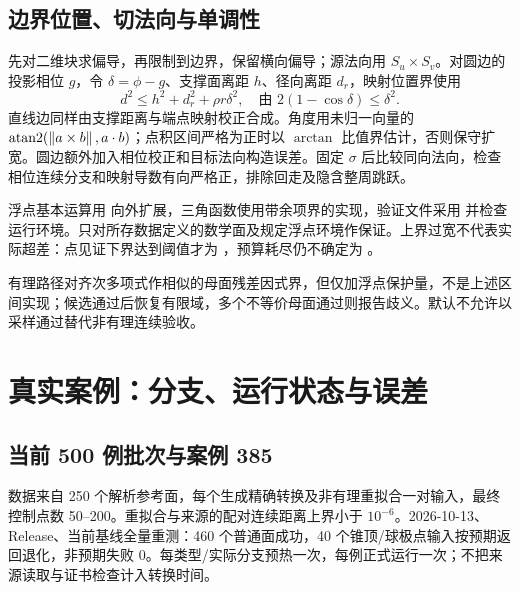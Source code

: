 \subsection{边界位置、切法向与单调性}
先对二维块求偏导，再限制到边界，保留横向偏导；源法向用 $S_u\times S_v$。对圆边的投影相位 $g$，令 $\delta=\phi-g$、支撑面离距 $h$、径向离距 $d_r$，映射位置界使用
\begin{equation}
 d^2\le h^2+d_r^2+\rho r\delta^2,
 \quad\text{由 }2(1-\cos\delta)\le\delta^2.
\end{equation}
直线边同样由支撑距离与端点映射校正合成。角度用未归一向量的 $\operatorname{atan2}(\left\lVert a\times b\right\rVert,a\cdot b)$；点积区间严格为正时以 $\arctan$ 比值界估计，否则保守扩宽。圆边额外加入相位校正和目标法向构造误差。固定 $\sigma$ 后比较同向法向，检查相位连续分支和映射导数有向严格正，排除回走及隐含整周跳跃。

\begin{center}\end{center}
浮点基本运算用  向外扩展，三角函数使用带余项界的实现，验证文件采用  并检查运行环境。只对所存数据定义的数学面及规定浮点环境作保证。上界过宽不代表实际超差：点见证下界达到阈值才为 ，预算耗尽仍不确定为 。

有理路径对齐次多项式作相似的母面残差因式界，但仅加浮点保护量，不是上述区间实现；候选通过后恢复有限域，多个不等价母面通过则报告歧义。默认不允许以采样通过替代非有理连续验收。

\clearpage
\section{真实案例：分支、运行状态与误差}
\subsection{当前 500 例批次与案例 385}
数据来自 250 个解析参考面，每个生成精确转换及非有理重拟合一对输入，最终控制点数 50--200。重拟合与来源的配对连续距离上界小于 $10^{-6}$。2026-10-13、Release、当前基线全量重测：460 个普通面成功，40 个锥顶/球极点输入按预期返回退化，非预期失败 0。每类型/实际分支预热一次，每例正式运行一次；不把来源读取与证书检查计入转换时间。

